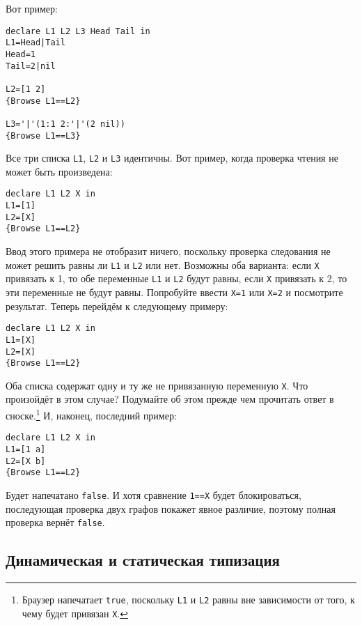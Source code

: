 Вот пример:

\begin{lstlisting}
declare L1 L2 L3 Head Tail in
L1=Head|Tail
Head=1
Tail=2|nil

L2=[1 2]
{Browse L1==L2}

L3='|'(1:1 2:'|'(2 nil))
{Browse L1==L3}
\end{lstlisting}

Все три списка \lstinline!L1!, \lstinline!L2! и \lstinline!L3! идентичны. Вот пример, когда проверка чтения не может быть произведена:

\begin{lstlisting}
declare L1 L2 X in
L1=[1]
L2=[X]
{Browse L1==L2}
\end{lstlisting}

Ввод этого примера не отобразит ничего, поскольку проверка следования не может решить равны ли \lstinline!L1! и \lstinline!L2! или нет. Возможны оба варианта: если \lstinline!X! привязать к 1, то обе переменные \lstinline!L1! и \lstinline!L2! будут равны, если \lstinline!X! привязать к 2, то эти переменные не будут равны. Попробуйте ввести \lstinline!X=1! или \lstinline!X=2! и посмотрите результат. Теперь перейдём к следующему примеру:

\begin{lstlisting}
declare L1 L2 X in
L1=[X]
L2=[X]
{Browse L1==L2}
\end{lstlisting}

Оба списка содержат одну и ту же не привязанную переменную \lstinline!X!. Что произойдёт в этом случае? Подумайте об этом прежде чем прочитать ответ в сноске.\footnote{Браузер напечатает \lstinline!true!, поскольку \lstinline!L1! и \lstinline!L2! равны вне зависимости от того, к чему будет привязан \lstinline!X!.} И, наконец, последний пример:

\begin{lstlisting}
declare L1 L2 X in
L1=[1 a]
L2=[X b]
{Browse L1==L2}
\end{lstlisting}

Будет напечатано \lstinline!false!. И хотя сравнение \lstinline!1==X! будет блокироваться, последующая проверка двух графов покажет явное различие, поэтому полная проверка вернёт \lstinline!false!.

\subsection{Динамическая и статическая типизация}\label{subsection:dynamic_and_static_typing}

